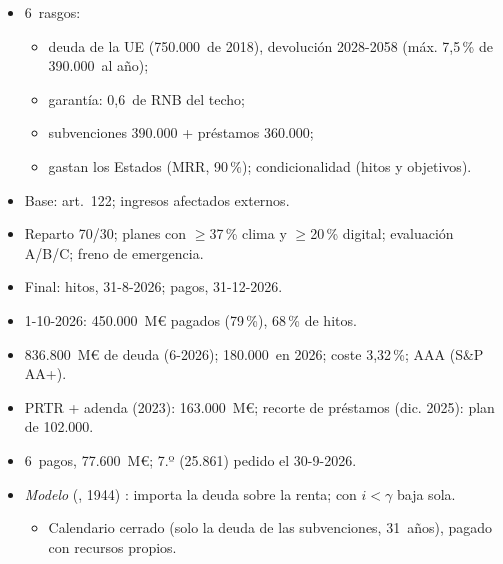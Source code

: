 \documentclass{article}
\begin{document}
\begin{columnas}
\begin{itemize}
\item 6~rasgos:
  \begin{itemize}
  \item deuda de la UE (750.000~de 2018), devolución 2028-2058 (máx. 7,5\,\% de 390.000~al año);
  \item garantía: 0,6~de RNB del techo;
  \item subvenciones 390.000 + préstamos 360.000;
  \item gastan los Estados (MRR, 90\,\%); condicionalidad (hitos y objetivos).
  \end{itemize}
\item Base: art.~122; ingresos afectados externos.
\end{itemize}
\begin{itemize}
\item Reparto 70/30; planes con $\geq$37\,\% clima y $\geq$20\,\% digital; evaluación A/B/C; freno de emergencia.
\item Final: hitos, 31-8-2026; pagos, 31-12-2026.
\item 1-10-2026: 450.000~M€ pagados (79\,\%), 68\,\% de hitos.
\end{itemize}
\begin{itemize}
\item 836.800~M€ de deuda (6-2026); 180.000~en 2026; coste 3,32\,\%; AAA (S\&P AA+).
\end{itemize}
\begin{itemize}
\item PRTR + adenda (2023): 163.000~M€; recorte de préstamos (dic. 2025): plan de 102.000.
\item 6~pagos, 77.600~M€; 7.º (25.861) pedido el 30-9-2026.
\end{itemize}
\begin{itemize}
\item \emph{Modelo} (, 1944) : importa la deuda sobre la renta; con $i<\gamma$ baja sola.
  \begin{itemize}
  \item Calendario cerrado (solo la deuda de las subvenciones, 31~años), pagado con recursos propios.

\end{itemize}
\end{itemize}
\end{columnas}
\end{document}
